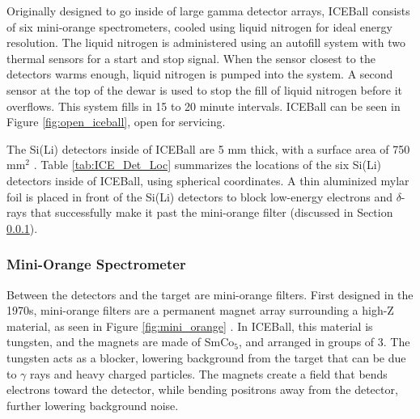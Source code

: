 Originally designed to go inside of large gamma detector arrays, ICEBall consists of six mini-orange spectrometers, cooled using liquid nitrogen for ideal energy resolution. The liquid nitrogen is administered using an autofill system with two thermal sensors for a start and stop signal. When the sensor closest to the detectors warms enough, liquid nitrogen is pumped into the system. A second sensor at the top of the dewar is used to stop the fill of liquid nitrogen before it overflows. This system fills in 15 to 20 minute intervals. ICEBall can be seen in Figure \ref{fig:open_iceball}, open for servicing.



The Si(Li) detectors inside of ICEBall are 5 mm thick, with a surface area of 750 mm$^2$ \citep{metlay93:_iceball_comm}. Table \ref{tab:ICE_Det_Loc} summarizes the locations of the six Si(Li) detectors inside of ICEBall, using spherical coordinates. A thin aluminized mylar foil is placed in front of the Si(Li) detectors to block low-energy electrons and $\delta$-rays that successfully make it past the mini-orange filter (discussed in Section \ref{sec:mini_orange}).



\subsubsection{Mini-Orange Spectrometer}
\label{sec:mini_orange}

Between the detectors and the target are mini-orange filters. First designed in the 1970s, mini-orange filters are a permanent magnet array surrounding a high-Z material, as seen in Figure \ref{fig:mini_orange} \citep{vanklinken72:mini_orange, vanklinken75:mini_orange}. In ICEBall, this material is tungsten, and the magnets are made of SmCo$_5$, and arranged in groups of 3. The tungsten acts as a blocker, lowering background from the target that can be due to $\gamma$ rays and heavy charged particles. The magnets create a field that bends electrons toward the detector, while bending positrons away from the detector, further lowering background noise. 



